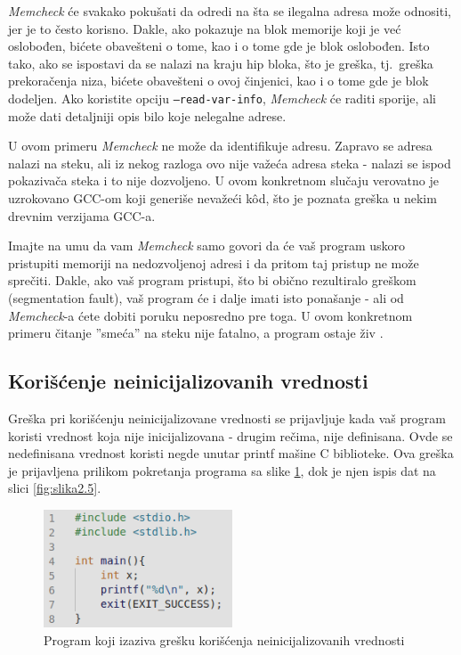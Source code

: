 \documentclass[12pt,oneside]{memoir}
\theoremstyle{plain}
\theoremstyle{definition}
\begin{document}
\textit{Memcheck} će svakako pokušati da odredi na šta se ilegalna adresa može odnositi, jer je to često korisno. Dakle, ako pokazuje na blok memorije koji je već oslobođen, bićete obavešteni o tome, kao i o tome gde je blok oslobođen. Isto tako, ako se ispostavi da se nalazi na kraju hip bloka, što je greška, tj.~greška prekoračenja niza, bićete obavešteni o ovoj činjenici, kao i o tome gde je blok dodeljen. Ako koristite opciju \texttt{--read-var-info}, \textit{Memcheck} će raditi sporije, ali može dati detaljniji opis bilo koje nelegalne adrese.

U ovom primeru \textit{Memcheck} ne može da identifikuje adresu. Zapravo se adresa nalazi na steku, ali iz nekog razloga ovo nije važeća adresa steka - nalazi se ispod pokazivača steka i to nije dozvoljeno. U ovom konkretnom slučaju verovatno je uzrokovano GCC-om koji generiše nevažeći k\^od, što je poznata greška u nekim drevnim verzijama GCC-a.

Imajte na umu da vam \textit{Memcheck} samo govori da će vaš program uskoro pristupiti memoriji na nedozvoljenoj adresi i da pritom taj pristup ne može sprečiti. Dakle, ako vaš program pristupi, što bi obično rezultiralo greškom (segmentation fault), vaš program će i dalje imati isto ponašanje - ali od \textit{Memcheck}-a ćete dobiti poruku neposredno pre toga. U ovom konkretnom primeru čitanje ''smeća'' na steku nije fatalno, a program ostaje živ \cite{Memcheck}. 

\subsection{Korišćenje neinicijalizovanih vrednosti}
Greška pri korišćenju neinicijalizovane vrednosti se prijavljuje kada vaš program koristi vrednost koja nije inicijalizovana - drugim rečima, nije definisana. Ovde se nedefinisana vrednost koristi negde unutar printf mašine C biblioteke. Ova greška je prijavljena prilikom pokretanja programa sa slike \ref{fig:slika2.4}, dok je njen ispis dat na slici \ref{fig:slika2.5}.

\begin{figure}[!ht]
  \centering
  \includegraphics[width=0.5\textwidth]{uninitialisedErrorProgram.png}
  \caption{Program koji izaziva grešku korišćenja neinicijalizovanih vrednosti}
  \label{fig:slika2.4}
\end{figure}
\end{document}
